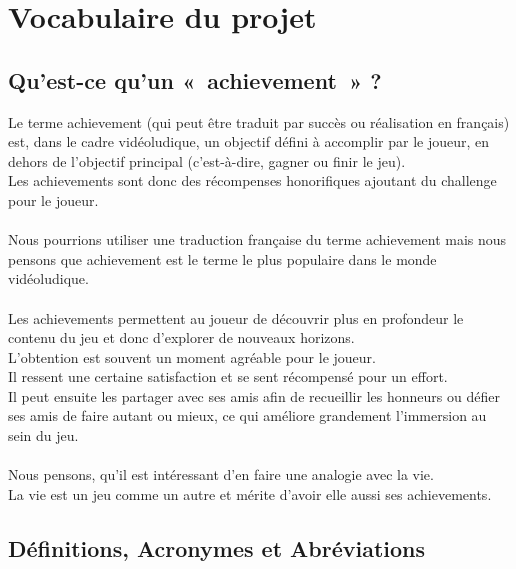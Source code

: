 \documentclass{life-fr}
\begin{document}

\section{Vocabulaire du projet}

\subsection{Qu'est-ce qu'un «~achievement~» ?}
Le terme achievement (qui peut être traduit par succès ou réalisation en français) est, dans le cadre vidéoludique,  un objectif défini à accomplir par le joueur, en dehors de l’objectif principal (c’est-à-dire, gagner ou finir le jeu).\\
 Les achievements sont donc des récompenses honorifiques ajoutant du challenge pour le joueur.\\
\\
Nous pourrions utiliser une traduction française du terme achievement mais nous pensons que achievement est le terme le plus populaire dans le monde vidéoludique.\\
\\
Les achievements permettent au joueur de découvrir plus en profondeur le contenu du jeu et donc d’explorer de nouveaux horizons.\\
 L’obtention est souvent un moment agréable pour le joueur.\\
 Il ressent une certaine satisfaction et se sent récompensé pour un effort.\\
 Il peut ensuite les partager avec ses amis afin de recueillir les honneurs ou défier ses amis de faire autant ou mieux, ce qui améliore grandement l’immersion au sein du jeu.\\
\\
Nous pensons, qu’il est intéressant d’en faire une analogie avec la vie.\\
 La vie est un jeu comme un autre et mérite d’avoir elle aussi ses achievements.

\subsection{Définitions, Acronymes et Abréviations}
\end{document}
